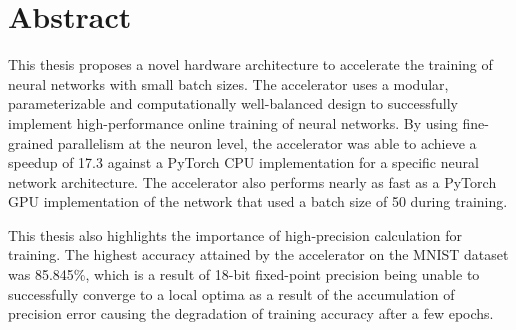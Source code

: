 \chapter{Abstract}

This thesis proposes a novel hardware architecture to accelerate the training of neural networks with small batch sizes. The accelerator uses a modular, parameterizable and computationally well-balanced design to successfully implement high-performance online training of neural networks. By using fine-grained parallelism at the neuron level, the accelerator was able to achieve a speedup of 17.3 against a PyTorch CPU implementation for a specific neural network architecture. The accelerator also performs nearly as fast as a PyTorch GPU implementation of the network that used a batch size of 50 during training.

This thesis also highlights the importance of high-precision calculation for training. The highest accuracy attained by the accelerator on the MNIST dataset was 85.845\%, which is a result of 18-bit fixed-point precision being unable to successfully converge to a local optima as a result of the accumulation of precision error causing the degradation of training accuracy after a few epochs.

